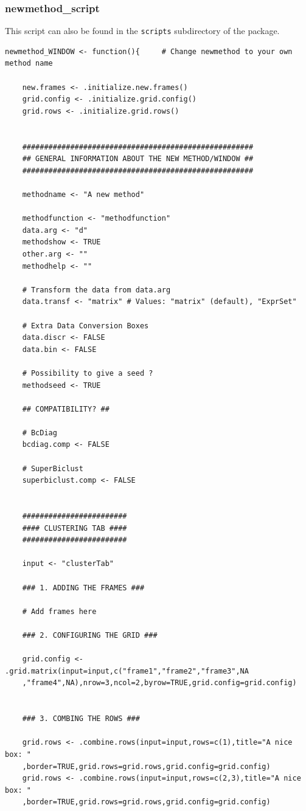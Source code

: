 \documentclass[a4paper]{article}\usepackage[]{graphicx}\usepackage[]{color}
\begin{document}
\subsubsection{newmethod\_script}
\noindent This script can also be found in the \verb|scripts| subdirectory of the
package.
\begin{verbatim}
newmethod_WINDOW <- function(){     # Change newmethod to your own method name
	
	new.frames <- .initialize.new.frames()
	grid.config <- .initialize.grid.config()
	grid.rows <- .initialize.grid.rows()
	
	
	#####################################################
	## GENERAL INFORMATION ABOUT THE NEW METHOD/WINDOW ##
	#####################################################

	methodname <- "A new method"

	methodfunction <- "methodfunction"
	data.arg <- "d"
	methodshow <- TRUE
	other.arg <- ""
	methodhelp <- ""

	# Transform the data from data.arg
	data.transf <- "matrix" # Values: "matrix" (default), "ExprSet"

	# Extra Data Conversion Boxes
	data.discr <- FALSE
	data.bin <- FALSE
		
	# Possibility to give a seed ?
	methodseed <- TRUE
	
	## COMPATIBILITY? ##
	
	# BcDiag
	bcdiag.comp <- FALSE
	
	# SuperBiclust
	superbiclust.comp <- FALSE
	
		
	########################
	#### CLUSTERING TAB ####
	########################
	
	input <- "clusterTab"
	
	### 1. ADDING THE FRAMES ###
	
	# Add frames here
	
	### 2. CONFIGURING THE GRID ###
	
	grid.config <- .grid.matrix(input=input,c("frame1","frame2","frame3",NA
    ,"frame4",NA),nrow=3,ncol=2,byrow=TRUE,grid.config=grid.config)
	
	
	### 3. COMBING THE ROWS ###

	grid.rows <- .combine.rows(input=input,rows=c(1),title="A nice box: "
    ,border=TRUE,grid.rows=grid.rows,grid.config=grid.config)
	grid.rows <- .combine.rows(input=input,rows=c(2,3),title="A nice box: "
    ,border=TRUE,grid.rows=grid.rows,grid.config=grid.config)
	
	
	

\end{verbatim}
\end{document}
